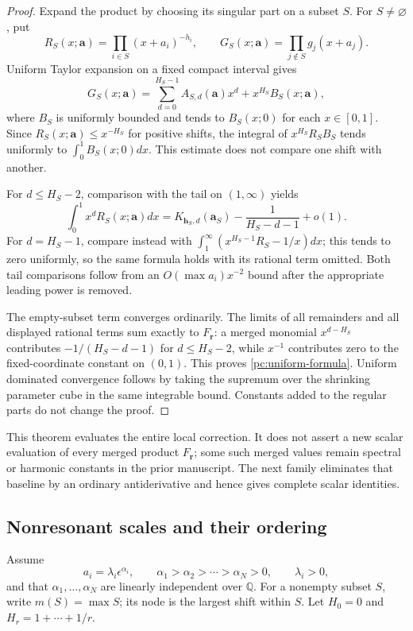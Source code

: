 \begin{proof}
Expand the product by choosing its singular part on a subset $S$.
For $S\ne\varnothing$, put
\[
 R_S(x;\boldsymbol a)=\prod_{i\in S}(x+a_i)^{-h_i},\qquad
 G_S(x;\boldsymbol a)=\prod_{j\notin S}g_j(x+a_j).
\]
Uniform Taylor expansion on a fixed compact interval gives
\[
 G_S(x;\boldsymbol a)
    =\sum_{d=0}^{H_S-1}A_{S,d}(\boldsymbol a)x^d
                   +x^{H_S}B_S(x;\boldsymbol a),
\]
where $B_S$ is uniformly bounded and tends to $B_S(x;0)$ for each
$x\in[0,1]$.  Since $R_S(x;\boldsymbol a)\le x^{-H_S}$ for
positive shifts, the integral of $x^{H_S}R_SB_S$ tends uniformly
to $\int_0^1B_S(x;0)dx$.  This estimate does not compare one shift
with another.

For $d\le H_S-2$, comparison with the tail on $(1,\infty)$ yields
\[
 \int_0^1x^dR_S(x;\boldsymbol a)dx
       =K_{\boldsymbol h_S,d}(\boldsymbol a_S)
                              -\frac1{H_S-d-1}+o(1).
\]
For $d=H_S-1$, compare instead with
$\int_1^\infty(x^{H_S-1}R_S-1/x)dx$; this tends to zero uniformly,
so the same formula holds with its rational term omitted.  Both
tail comparisons follow from an $O(\max a_i)x^{-2}$ bound after
the appropriate leading power is removed.

The empty-subset term converges ordinarily.  The limits of all
remainders and all displayed rational terms sum exactly to
$F_{\boldsymbol r}$: a merged monomial $x^{d-H_S}$ contributes
$-1/(H_S-d-1)$ for $d\le H_S-2$, while $x^{-1}$ contributes
zero to the fixed-coordinate constant on $(0,1)$.  This proves
\eqref{pc:uniform-formula}.  Uniform dominated convergence follows
by taking the supremum over the shrinking parameter cube in the
same integrable bound.  Constants added to the regular parts
do not change the proof.
\end{proof}

This theorem evaluates the entire local correction.  It does not assert
a new scalar evaluation of every merged product $F_{\boldsymbol r}$;
some such merged values remain spectral or harmonic constants in the
prior manuscript.  The next family eliminates that baseline by an
ordinary antiderivative and hence gives complete scalar identities.

\subsection{Nonresonant scales and their ordering}

Assume
\begin{equation}\label{pc:scales}
 a_i=\lambda_i\epsilon^{\alpha_i},\qquad
 \alpha_1>\alpha_2>\cdots>\alpha_N>0,\qquad\lambda_i>0,
\end{equation}
and that $\alpha_1,\ldots,\alpha_N$ are linearly independent over
$\mathbb Q$.  For a nonempty subset $S$, write $m(S)=\max S$;
its node is the largest shift within $S$.  Let $H_0=0$ and
$H_r=1+\cdots+1/r$.

